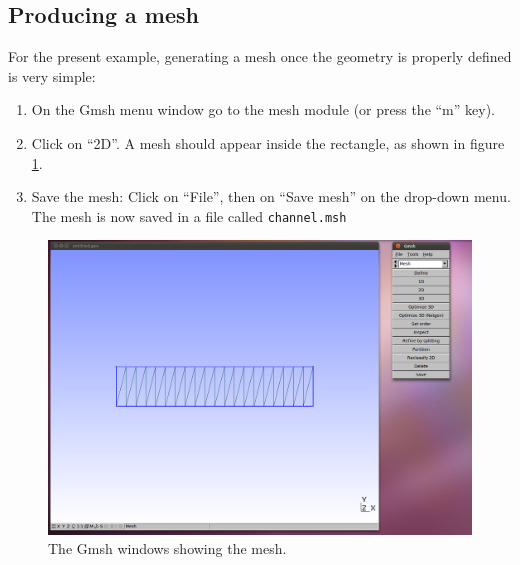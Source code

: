 \subsection{Producing a mesh}
\label{ssect:2d_producing_a_mesh}
\par
For the present example, generating a mesh once the geometry is properly defined is very simple:
\begin{enumerate}
  \item On the Gmsh menu window go to the mesh module (or press the ``m'' key).
  \item Click on ``2D''. A mesh should appear inside the rectangle, as shown in figure \ref{fig:shot16}.
  \item Save the mesh: Click on ``File'', then on ``Save mesh'' on the drop-down menu. The mesh is
        now saved in a file called \lstinline{channel.msh}
\end{enumerate}
\begin{figure}[htbp]
 \centering
  \includegraphics[width=1.0\textwidth]{../figures/shot16}
  \caption{The Gmsh windows showing the mesh.}
  \label{fig:shot16}
\end{figure}
